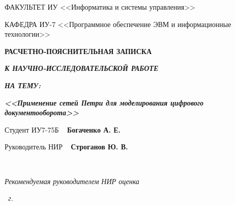 \begin{titlepage}
\begin{flushleft}
		ФАКУЛЬТЕТ ИУ <<Информатика и системы управления>>

		КАФЕДРА ИУ-7 <<Программное обеспечение ЭВМ и информационные технологии>>
	\end{flushleft}

	\vfill

	\begin{center}
		\fontsize{20pt}{\baselineskip}\selectfont

		\textbf{РАСЧЕТНО-ПОЯСНИТЕЛЬНАЯ ЗАПИСКА}

		\textbf{\textit{К НАУЧНО-ИССЛЕДОВАТЕЛЬСКОЙ РАБОТЕ}}

		\textbf{\textit{НА ТЕМУ:}}
	\end{center}

	\begin{center}
		\fontsize{20pt}{0.6cm}\selectfont 
		
		\textit{\bfseries{<<Применение сетей Петри для моделирования цифрового документооборота>>}}
		
	\end{center}

	\vfill
	
	\fontsize{12pt}{0.6cm}\selectfont
	Студент \hspace{1.1cm} ИУ7-75Б \hspace{3.83cm} \uline{\mbox{\hspace*{3.5cm}}}~ \textbf{Богаченко А. Е.}
	
	\vfill
	
	Руководитель НИР \hspace{4.8cm} \uline{\mbox{\hspace*{3.5cm}}}~ \textbf{Строганов Ю. В.}
	
	~~
	
	\textit{Рекомендуемая руководителем НИР оценка}~\uline{\mbox{\hspace*{3.5cm}}}
	
	\vfill

	\begin{center}
		\normalsize \textit{\the \year~г.}
	\end{center}
\end{titlepage}